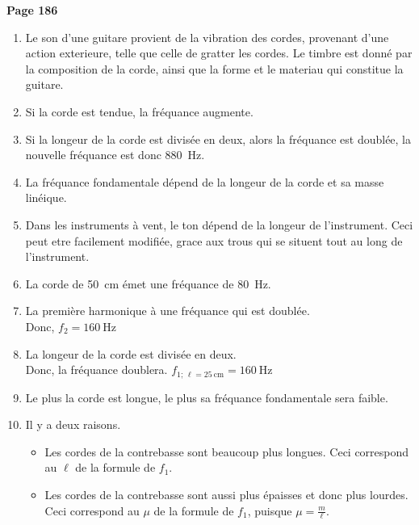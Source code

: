 \documentclass[12pt]{article}
\begin{document}
 
    \textbf{Page 186}
    \begin{enumerate}[1)]
        \item Le son d'une guitare provient de la vibration des cordes, provenant d'une action exterieure, telle que celle de gratter les cordes. Le timbre est donné par la composition de la corde, ainsi que la forme et le materiau qui constitue la guitare.
        \item Si la corde est tendue, la fréquance augmente.
        \item Si la longeur de la corde est divisée en deux, alors la fréquance est doublée, la nouvelle fréquance est donc \SI{880}{\Hz}.
        \item La fréquance fondamentale dépend de la longeur de la corde et sa masse linéique.
        \item Dans les instruments à vent, le ton dépend de la longeur de l'instrument. Ceci peut etre facilement modifiée, grace aux trous qui se situent tout au long de l'instrument.
        \item La corde de \SI{50}{\cm} émet une fréquance de \SI{80}{\Hz}.
        \item La première harmonique à une fréquance qui est doublée. \\ Donc, $f_2=\SI{160}{\Hz}$
        \item La longeur de la corde est divisée en deux. \\ Donc, la fréquance doublera. $f_{1;\,\ell=\SI{25}{\cm}}=\SI{160}{\Hz}$
        \item Le plus la corde est longue, le plus sa fréquance fondamentale sera faible.
        \item Il y a deux raisons.
                \begin{itemize}
                    \item Les cordes de la contrebasse sont beaucoup plus longues. Ceci correspond au $\ell$ de la formule de $f_1$.
                    \item Les cordes de la contrebasse sont aussi plus épaisses et donc plus lourdes. Ceci correspond au $\mu$ de la formule de $f_1$, puisque $\mu=\frac{m}{\ell}$.
                \end{itemize}
    \end{enumerate}
\end{document}
